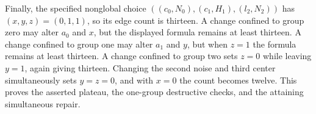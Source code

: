 Finally, the specified nonglobal choice \(((c_0,N_0),(c_1,H_1),(l_2,N_2))\) has \((x,y,z)=(0,1,1)\), so its edge count is thirteen.  A change confined to group zero may alter \(a_0\) and \(x\), but the displayed formula remains at least thirteen.  A change confined to group one may alter \(a_1\) and \(y\), but when \(z=1\) the formula remains at least thirteen.  A change confined to group two sets \(z=0\) while leaving \(y=1\), again giving thirteen.  Changing the second noise and third center simultaneously sets \(y=z=0\), and with \(x=0\) the count becomes twelve.  This proves the asserted plateau, the one-group destructive checks, and the attaining simultaneous repair.
